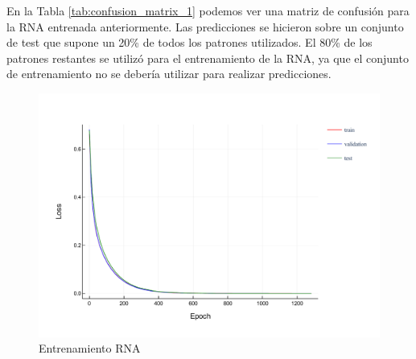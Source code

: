 \documentclass[12pt]{article}
\begin{document}
\bigskip
En la Tabla \ref{tab:confusion_matrix_1} podemos ver una matriz de confusión para la RNA entrenada anteriormente. Las predicciones se hicieron sobre un conjunto
de test que supone un 20\% de todos los patrones utilizados. El 80\% de los patrones restantes se utilizó para el entrenamiento de la RNA,
ya que el conjunto de entrenamiento no se debería utilizar para realizar predicciones.

\begin{figure}[!ht]
	\centering
	\includegraphics[width=1.0\linewidth]{assets/best_rna_train_1.pdf}
	\caption{Entrenamiento RNA}
	\label{fig:rna_train_1}
\end{figure}
\end{document}
